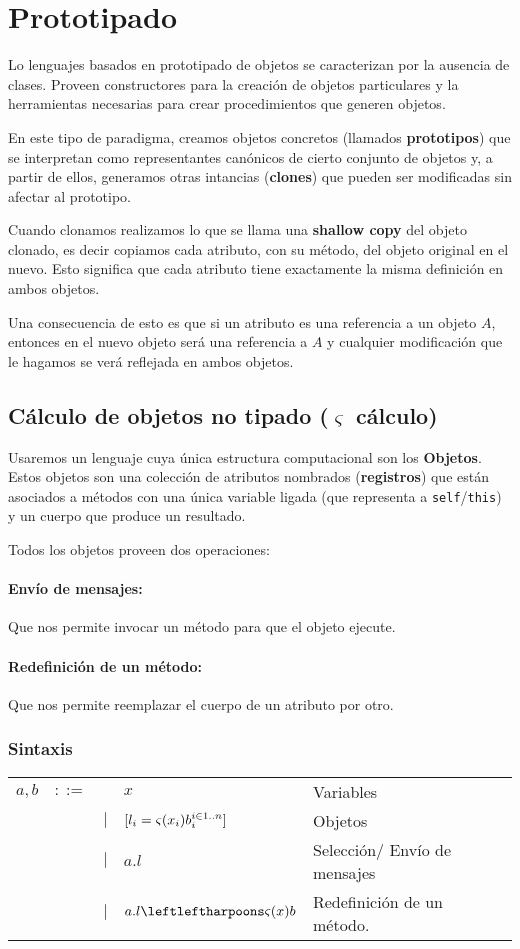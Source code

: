 
\section{Prototipado}
Lo lenguajes basados en prototipado de objetos se caracterizan por la ausencia de clases. Proveen constructores para la creación de objetos particulares y la herramientas necesarias para crear procedimientos que generen objetos.

En este tipo de paradigma, creamos objetos concretos (llamados \textbf{prototipos}) que se interpretan como representantes canónicos de cierto conjunto de objetos y, a partir de ellos, generamos otras intancias (\textbf{clones}) que pueden ser modificadas sin afectar al prototipo.

Cuando clonamos realizamos lo que se llama una \textbf{shallow copy} del objeto clonado, es decir copiamos cada atributo, con su método, del objeto original en el nuevo. Esto significa que cada atributo tiene exactamente la misma definición en ambos objetos.

Una consecuencia de esto es que si un atributo es una referencia a un objeto $A$, entonces en el nuevo objeto será una referencia a $A$ y cualquier modificación que le hagamos se verá reflejada en ambos objetos.

\subsection{Cálculo de objetos no tipado \texorpdfstring{($\varsigma$ cálculo)}{}}
Usaremos un lenguaje cuya única estructura computacional son los \textbf{Objetos}. Estos objetos son una colección de atributos nombrados (\textbf{registros}) que están asociados a métodos con una única variable ligada (que representa a \texttt{self}/\texttt{this}) y un cuerpo que produce un resultado.

Todos los objetos proveen dos operaciones:

\paragraph{Envío de mensajes:} Que nos permite invocar un método para que el objeto ejecute.

\paragraph{Redefinición de un método:} Que nos permite reemplazar el cuerpo de un atributo por otro.

\subsubsection{Sintaxis}
\begin{tabular}{lllll}
	$a,b$ &$::=$& &$x$ & Variables \\
 	      &     & $|$ &$[l_i = \varsigma(x_i)b_i^{i\in1..n}]$ &  Objetos\\
 	      &     & $|$ &$a.l$ &  Selección/ Envío de mensajes \\
 	      &     & $|$ &$\OORedefinicion{a.l}{x}{b}$ &  Redefinición de un método.	       	       	      
\end{tabular}

